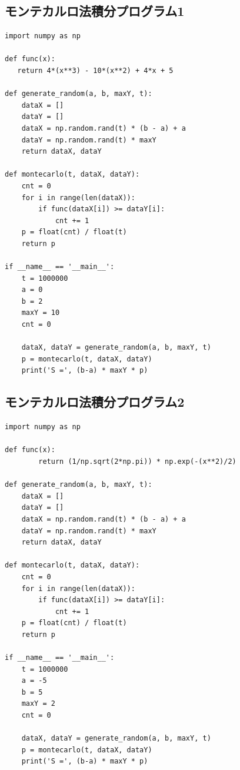 \documentclass[a4paper, titlepage]{jsarticle}
\begin{document}
	\subsection{モンテカルロ法積分プログラム1}
		\begin{lstlisting}
import numpy as np

def func(x):
   return 4*(x**3) - 10*(x**2) + 4*x + 5

def generate_random(a, b, maxY, t):
    dataX = []
    dataY = []
    dataX = np.random.rand(t) * (b - a) + a
    dataY = np.random.rand(t) * maxY
    return dataX, dataY

def montecarlo(t, dataX, dataY):
    cnt = 0
    for i in range(len(dataX)):
        if func(dataX[i]) >= dataY[i]:
            cnt += 1
    p = float(cnt) / float(t)
    return p

if __name__ == '__main__':
    t = 1000000
    a = 0
    b = 2
    maxY = 10
    cnt = 0

    dataX, dataY = generate_random(a, b, maxY, t)
    p = montecarlo(t, dataX, dataY)
    print('S =', (b-a) * maxY * p)
		\end{lstlisting}

	\subsection{モンテカルロ法積分プログラム2}
		\begin{lstlisting}
import numpy as np

def func(x):
		return (1/np.sqrt(2*np.pi)) * np.exp(-(x**2)/2)

def generate_random(a, b, maxY, t):
    dataX = []
    dataY = []
    dataX = np.random.rand(t) * (b - a) + a
    dataY = np.random.rand(t) * maxY
    return dataX, dataY

def montecarlo(t, dataX, dataY):
    cnt = 0
    for i in range(len(dataX)):
        if func(dataX[i]) >= dataY[i]:
            cnt += 1
    p = float(cnt) / float(t)
    return p

if __name__ == '__main__':
    t = 1000000
    a = -5
    b = 5
    maxY = 2
    cnt = 0

    dataX, dataY = generate_random(a, b, maxY, t)
    p = montecarlo(t, dataX, dataY)
    print('S =', (b-a) * maxY * p)
		\end{lstlisting}
\end{document}
